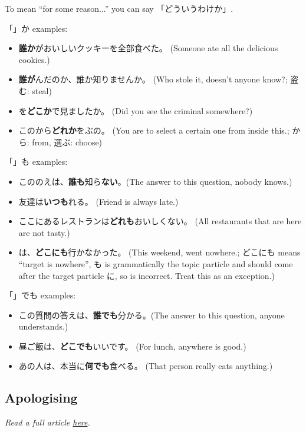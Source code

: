 \documentclass[../nihongo-gakushuu-kyouzai.tex]{subfiles}
\begin{document}
To mean ``for some reason...'' you can say 「どういうわけか」.

「」か examples:
\begin{itemize}
    \item \textbf{誰か}がおいしいクッキーを全部食べた。 (Someone ate all the delicious cookies.)
    \item \textbf{誰が}んだのか、誰か知りませんか。 (Who stole it, doesn't anyone know?; 盗む: steal)
    \item {}を\textbf{どこか}で見ましたか。 (Did you see the criminal somewhere?)
    \item このから\textbf{どれか}をぶの。 (You are to select a certain one from inside this.; から: from, 選ぶ: choose)
\end{itemize}

「」も examples:
\begin{itemize}
    \item こののえは、\textbf{誰も}知ら\textbf{ない}。(The answer to this question, nobody knows.)
    \item 友達は\textbf{いつも}れる。 (Friend is always late.)
    \item ここにあるレストランは\textbf{どれも}おいしくない。 (All restaurants that are here are not tasty.)
    \item {}は、\textbf{どこにも}行かなかった。 (This weekend, went nowhere.; どこにも means ``target is nowhere'', も is grammatically the topic particle and should come after the target particle に, so  is incorrect. Treat this as an exception.)
\end{itemize}

「」でも examples:
\begin{itemize}
    \item この質問の答えは、\textbf{誰でも}分かる。(The answer to this question, anyone understands.)
    \item 昼ご飯は、\textbf{どこでも}いいです。 (For lunch, anywhere is good.)
    \item あの人は、本当に\textbf{何でも}食べる。 (That person really eats anything.)
\end{itemize}

\subsection{Apologising}
\emph{Read a full article \href{https://www.clozemaster.com/blog/sorry-in-japanese/}{here}.}
\end{document}
